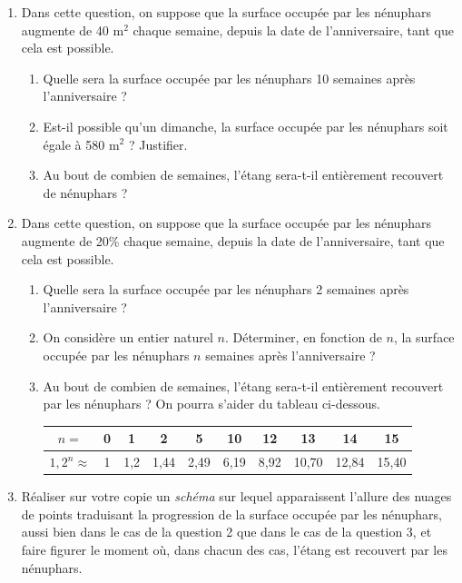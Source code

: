 \documentclass[10pt]{article}
\begin{document}
\begin{enumerate}[resume]
\item Dans cette question, on suppose que la surface occupée par les nénuphars augmente de 40 m$^2$ chaque semaine, depuis la date de l'anniversaire, tant que cela est possible.
\begin{enumerate}
\item Quelle sera la surface occupée par les nénuphars 10 semaines après l'anniversaire ?
\item Est-il possible qu'un dimanche, la surface occupée par les nénuphars soit égale à 580 m$^2$ ? Justifier.
\item Au bout de combien de semaines, l'étang sera-t-il entièrement recouvert de nénuphars ?
\end{enumerate}

\item Dans cette question, on suppose que la surface occupée par les nénuphars augmente de 20\% chaque semaine, depuis la date de l'anniversaire, tant que cela est possible.
\begin{enumerate}
\item Quelle sera la surface occupée par les nénuphars 2 semaines après l'anniversaire ?
\item On considère un entier naturel $n$. Déterminer, en fonction de $n$, la surface occupée par les nénuphars $n$ semaines après l'anniversaire ?
\item Au bout de combien de semaines, l'étang sera-t-il entièrement recouvert par les nénuphars ? On pourra s'aider du tableau ci-dessous.

\begin{center}
\begin{tabular}{|c|c|c|c|c|c|c|c|c|c|}
\hline
$n = $ & 0 & 1 & 2 & 5 & 10 & 12 & 13 & 14 & 15 \\
\hline
$1,2^n \approx $ & 1 & 1,2 & 1,44 & 2,49 & 6,19 & 8,92 & 10,70 & 12,84 & 15,40 \\
\hline
\end{tabular}
\end{center}
\end{enumerate}

\item Réaliser sur votre copie un \textit{schéma} sur lequel apparaissent l'allure des nuages de points traduisant la progression de la surface occupée par les nénuphars, aussi bien dans le cas de la question 2 que dans le cas de la question 3, et faire figurer le moment où, dans chacun des cas, l'étang est recouvert par les nénuphars.
\end{enumerate}
\end{document}
